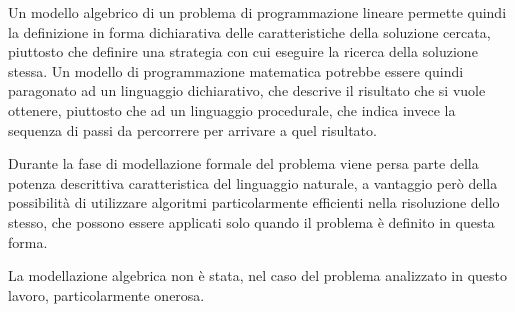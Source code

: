 Un modello algebrico di un problema di programmazione lineare permette quindi la definizione in forma dichiarativa delle caratteristiche della soluzione cercata, piuttosto che definire una strategia con cui eseguire la ricerca della soluzione stessa. Un modello di programmazione matematica potrebbe essere quindi paragonato ad un linguaggio dichiarativo, che descrive il risultato che si vuole ottenere, piuttosto che ad un linguaggio procedurale, che indica invece la sequenza di passi da percorrere per arrivare a quel risultato.

Durante la fase di modellazione formale del problema viene persa parte della potenza descrittiva caratteristica del linguaggio naturale, a vantaggio però della possibilità di utilizzare algoritmi particolarmente efficienti nella risoluzione dello stesso, che possono essere applicati solo quando il problema è definito in questa forma.

La modellazione algebrica non è stata, nel caso del problema analizzato in questo lavoro, particolarmente onerosa.

